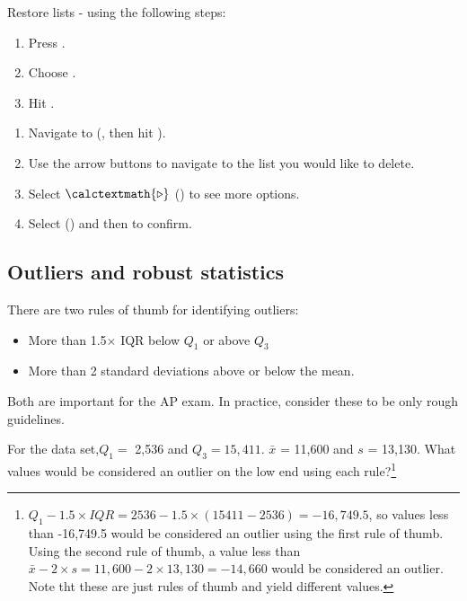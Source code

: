 \begin{tipBox}{
Restore lists - using the following steps:
\begin{enumerate}
\setlength{\itemsep}{0mm}
\item Press .
\item Choose .
\item Hit .
\end{enumerate}}
\end{tipBox}

\begin{tipBox}{
\begin{enumerate}
\setlength{\itemsep}{0mm}
\item Navigate to  (, then hit ).
\item Use the arrow buttons to navigate to the list you would like to delete.
\item Select $\calctextmath{\triangleright}$ () to see more options.
\item Select  () and then  to confirm.
\end{enumerate}
}
\end{tipBox}


\subsection{Outliers and robust statistics}

\begin{termBox}{
There are two rules of thumb for identifying outliers:
\begin{itemize}
\setlength{\itemsep}{0mm}
\item More than 1.5$\times$ IQR below $Q_1$ or above $Q_3$
\item More than 2 standard deviations above or below the mean.
\end{itemize}
Both are important for the AP exam. In practice, consider these to be only rough guidelines.}
\end{termBox}

\begin{exercise}For the  data set,$Q_1=$ 2,536 and $Q_3=15,411$. $\bar{x}$ = 11,600  and $s$ = 13,130. What values would be considered an outlier on the low end using each rule?\footnote{ $Q_1 - 1.5\times IQR = 2536 - 1.5 \times (15411 - 2536) = -16,749.5$, so values less than -16,749.5 would be considered an outlier using the first rule of thumb. Using the second rule of thumb, a value less than $\bar{x} - 2\times s = 11,600 - 2 \times 13,130 = -14,660$ would be considered an outlier. Note tht these are just rules of thumb and yield different values.}
\end{exercise}

